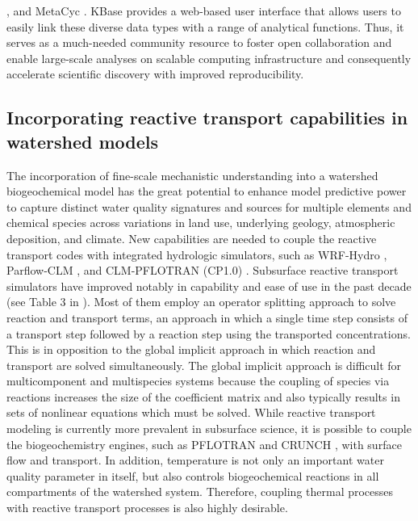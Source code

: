 \documentclass[preprint,review, 12pt]{elsarticle}
\begin{document}
\citep{Schellenberger2010}, and MetaCyc \citep{Caspi2006}. KBase provides a web-based user interface that allows users to easily link these diverse data types with a range of analytical functions. Thus, it serves as a much-needed community resource to foster open collaboration and enable large-scale analyses on scalable computing infrastructure and consequently accelerate scientific discovery with improved reproducibility. 
 
\subsection{Incorporating reactive transport capabilities in watershed models}

The incorporation of fine-scale mechanistic understanding into a watershed biogeochemical model has the great potential to enhance model predictive power to capture distinct water quality signatures and sources for multiple elements and chemical species across variations in land use, underlying geology, atmospheric deposition, and climate. New capabilities are needed to couple the reactive transport codes with integrated hydrologic simulators, such as WRF-Hydro \citep{Barlage}, Parflow-CLM \citep{Maxwell2015,Maxwell2016}, and CLM-PFLOTRAN (CP1.0) \citep{Bisht2017}. Subsurface reactive transport simulators have improved notably in capability and ease of use in the past decade (see Table 3 in \citep{Steefel2015}). Most of them employ an operator splitting approach to solve reaction and transport terms, an approach in which a single time step consists of a transport step followed by a reaction step using the transported concentrations. This is in opposition to the global implicit approach in which reaction and transport are solved simultaneously. The global implicit approach is difficult for multicomponent and multispecies systems because the coupling of species via reactions increases the size of the coefficient matrix and also typically results in sets of nonlinear equations which must be solved. While reactive transport modeling is currently more prevalent in subsurface science, it is possible to couple the biogeochemistry engines, such as PFLOTRAN \citep{Hammond2014b} and CRUNCH \citep{Steefel2015}, with surface flow and transport. In addition, temperature is not only an important water quality parameter in itself, but also controls biogeochemical reactions in all compartments of the watershed system. Therefore, coupling thermal processes with reactive transport processes is also highly desirable.
\end{document}
